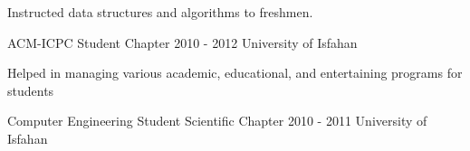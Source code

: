 \begin{cventries}
  
  \cventryx
  {
      \begin{cvitems}
        \item {Instructed data structures and algorithms to freshmen.}
      \end{cvitems}
    }
    {ACM-ICPC Student Chapter}
    {2010 - 2012}
    {University of Isfahan}
    
  \cventryx
  {
    \begin{cvitems}
        \item {Helped in managing various academic, educational, and entertaining programs for students}
      \end{cvitems}}
    {Computer Engineering Student Scientific Chapter}
    {2010 - 2011}
    {University of Isfahan}
    

\end{cventries}
